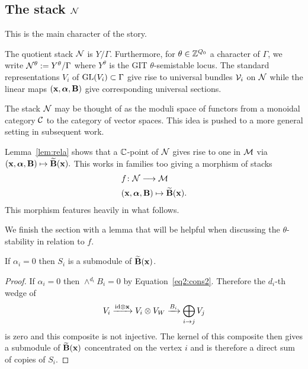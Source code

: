 \documentclass{amsart}
\newcommand{\balpha}{\boldsymbol{\alpha}}
\theoremstyle{definition}
\newcommand\VW{V_W}
\newcommand\Y{Y}
\begin{document}
\subsection{The stack $\mathcal{N}$}
This is the main character of the story.

\begin{definition}
The quotient stack $\mathcal{N}$ is $\Y/\Gamma$.
Furthermore, for $\theta \in \mathbb{Z}^{Q_0}$ a character of $\Gamma$, we write $\cN^\theta:= \Y^\theta/\Gamma$ where $\Y^\theta$ is the GIT $\theta$-semistable locus.
The standard representations $V_i$ of $\operatorname{GL}(V_i) \subset \Gamma$ give rise to universal bundles $\mathcal{V}_i$ on $\mathcal{N}$ while the linear maps $(\bfx, \balpha, \bfB)$ give corresponding universal sections.
\end{definition}

\begin{remark}
The stack $\mathcal{N}$ may be thought of as the moduli space of functors from a monoidal category $\mathcal{C}$ to the category of vector spaces.
This idea is pushed to a more general setting in subsequent work.
\end{remark}

Lemma~\ref{lem:rela} shows that a $\mathbb{C}$-point of $\mathcal{N}$ gives rise to one in $\mathcal{M}$ via $(\bfx, \balpha, \bfB) \mapsto \widetilde{\bfB}(\bfx).$
This works in families too giving a morphism of stacks
\begin{align*}
    & f \colon \cN \longrightarrow \cM \\
    & (\bfx, \balpha, \bfB) \mapsto \widetilde{\bfB}(\bfx).
\end{align*}
This morphism features heavily in what follows.

We finish the section with a lemma that will be helpful when discussing the $\theta$-stability in relation to $f$.

\begin{lemma}\label{lem:Si}
If $\alpha_i=0$ then $S_i$ is a submodule of $\widetilde{\mathbf{B}}(\mathbf{x})$.
\end{lemma}

\begin{proof}
If $\alpha_i=0$ then $\wedge^{d_i} B_i=0$ by Equation~\eqref{eq2:cons2}.
Therefore the $d_i$-th wedge of $$V_{i} \xrightarrow{\textup{id} \otimes \bfx} V_{i} \otimes \VW \xrightarrow{B_{i}} \bigoplus_{i \rightarrow j} V_j$$ is zero and this composite is not injective.
The kernel of this composite then gives a submodule of $\widetilde{\mathbf{B}}(\mathbf{x})$ concentrated on the vertex $i$ and is therefore a direct sum of copies of $S_i$.
\end{proof}
\end{document}
